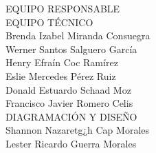 {\Bold \LARGE EQUIPO RESPONSABLE}\\[2cm]
{\Bold \large \color{color1!89!black} EQUIPO TÉCNICO}\\[0.2cm]
Brenda Izabel Miranda Consuegra\\
Werner Santos Salguero García\\
Henry Efraín Coc Ramírez\\
Eslie Mercedes Pérez Ruiz \\
Donald Estuardo Schaad Moz\\
Francisco Javier Romero Celis\\[0.8cm]
{\Bold \large \color{color1!89!black} DIAGRAMACIÓN Y DISEÑO}\\[0.2cm]
Shannon Nazaretg¿h Cap Morales \\
Lester Ricardo Guerra Morales
